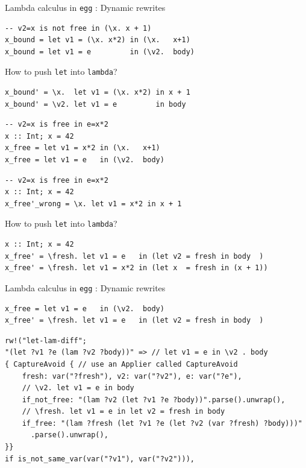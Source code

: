 \documentclass[8pt]{beamer}
\newcommand{\egg}{\texttt{egg} }
\begin{document}
\begin{frame}[fragile]{Lambda calculus in \egg: Dynamic rewrites}

\begin{verbatim}
-- v2=x is not free in (\x. x + 1)
x_bound = let v1 = (\x. x*2) in (\x.   x+1)
x_bound = let v1 = e         in (\v2.  body)
\end{verbatim}
\pause
How to push \texttt{let} into \texttt{lambda}?
\pause
\begin{verbatim}
x_bound' = \x.  let v1 = (\x. x*2) in x + 1
x_bound' = \v2. let v1 = e         in body
\end{verbatim}
\pause
\begin{verbatim}
-- v2=x is free in e=x*2
x :: Int; x = 42
x_free = let v1 = x*2 in (\x.   x+1)
x_free = let v1 = e   in (\v2.  body)
\end{verbatim}
\pause
\begin{verbatim}
-- v2=x is free in e=x*2
x :: Int; x = 42
x_free'_wrong = \x. let v1 = x*2 in x + 1
\end{verbatim}
How to push \texttt{let} into \texttt{lambda}?
\pause
\begin{verbatim}
x :: Int; x = 42
x_free' = \fresh. let v1 = e   in (let v2 = fresh in body  )
x_free' = \fresh. let v1 = x*2 in (let x  = fresh in (x + 1))
\end{verbatim}
\pause
\end{frame}

\begin{frame}[fragile]{Lambda calculus in \egg: Dynamic rewrites}
\begin{verbatim}
x_free = let v1 = e   in (\v2.  body)
x_free' = \fresh. let v1 = e   in (let v2 = fresh in body  )
\end{verbatim}

\begin{verbatim}
rw!("let-lam-diff";
"(let ?v1 ?e (lam ?v2 ?body))" => // let v1 = e in \v2 . body
{ CaptureAvoid { // use an Applier called CaptureAvoid
    fresh: var("?fresh"), v2: var("?v2"), e: var("?e"),
    // \v2. let v1 = e in body
    if_not_free: "(lam ?v2 (let ?v1 ?e ?body))".parse().unwrap(),
    // \fresh. let v1 = e in let v2 = fresh in body 
    if_free: "(lam ?fresh (let ?v1 ?e (let ?v2 (var ?fresh) ?body)))"
      .parse().unwrap(),
}}
if is_not_same_var(var("?v1"), var("?v2"))),
\end{verbatim}
\end{frame}
\end{document}
